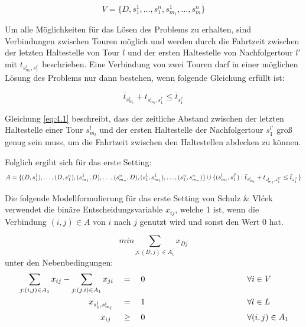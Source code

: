 \[
V = \{ D, s^1_1, \dots, s^n_1, s^1_{m_1}, \dots, s^n_m \}
\]

Um alle Möglichkeiten für das Lösen des Problems zu erhalten, sind Verbindungen zwischen Touren möglich und werden durch die Fahrtzeit zwischen der letzten Haltestelle von Tour $l$ und der ersten Haltestelle von Nachfolgertour $l'$ mit $t_{s^l_{m_l}, s^{l'}_1}$ beschrieben. Eine Verbindung von zwei Touren darf in einer möglichen Lösung des Problems nur dann bestehen, wenn folgende Gleichung erfüllt ist: 

\begin{equation}
    \label{eq:4.1}
    \bar{t}_{s^l_{m_l}} + t_{s^l_{m_l}, s^{l'}_1} \leq \bar{t}_{s^{l'}_1}
\end{equation}

Gleichung \ref{eq:4.1} beschreibt, dass der zeitliche Abstand zwischen der letzten Haltestelle einer Tour $s^l_{m_l}$ und der ersten Haltestelle der Nachfolgertour $s^{l'}_1$ groß genug sein muss, um die Fahrtzeit zwischen den Haltestellen abdecken zu können.

Folglich ergibt sich für das erste Setting:
\[
A = \{(D, s_1^1), \ldots, (D, s_1^n), (s_{m_1}^1, D), \ldots, (s_{m_n}^n, D), (s_1^1, s_{m_1}^1), \ldots, (s_1^n, s_{m_n}^n)\}   \\   
\cup \{(s_{m_l}^l, s_1^{l'}) : \bar{t}_{s_{m_l}^l} + t_{s_{m_l}^l, s_1^{l'}} \leq \bar{t}_{s_1^{l'}}\}
\]

Die folgende Modellformulierung für das erste Setting von Schulz \& Vlćek verwendet die binäre Entscheidungsvariable $x_{ij}$, welche 1 ist, wenn die Verbindung $(i,j) \in A$ von $i$ nach $j$  genutzt wird und sonst den Wert 0 hat.

\begin{equation}
    min \sum_{j:(D,j) \in A_1} x_{Dj}
\label{eq:4.2}
\end{equation}
unter den Nebenbedingungen:
\begin{alignat}{3}
    &\sum_{j:(i,j) \in A_1} x_{ij} - \sum_{j:(j,i) \in A_1} x_{ji} &&= \quad 0 \hspace{4cm} &&\forall i \in V \label{eq:4.3}\\
    &\hspace{3cm} x_{s_1^l, s_{m_l}^l} &&= \quad 1\hspace{4cm} &&\forall l \in L\label{eq:4.4}\\
    &\hspace{3.5cm} x_{ij} &&\geq \quad 0 \hspace{4cm}&&\forall (i,j) \in A_1\label{eq:4.5}
\end{alignat}

